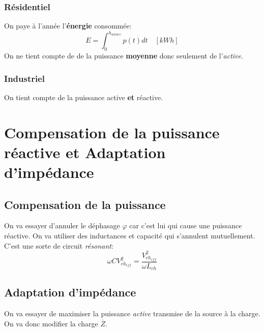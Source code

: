 \documentclass{report}
\begin{document}
\subsubsection{Résidentiel}
On paye à l'année l'\textbf{énergie} consommée:
\begin{equation}
E = \int_0^{h_{annee}} p(t) dt \quad [kWh]
\end{equation}
On ne tient compte de de la puissance \textbf{moyenne} donc seulement de l'\textit{active}.

\subsubsection{Industriel}
On tient compte de la puissance active \textbf{et} réactive.

\section{Compensation de la puissance réactive et Adaptation d'impédance}
\subsection{Compensation de la puissance}
On va essayer d'annuler le déphasage $\varphi$ car c'est lui qui cause une puissance réactive. On va utiliser des inductances et capacité qui s'annulent mutuellement. C'est une sorte de circuit \textit{résonant}:
\begin{equation}
\omega C V_{ch_{eff}}^2 = \frac{V_{ch_{eff}}^2}{\omega L_{ch}}
\end{equation}

\subsection{Adaptation d'impédance}
On va essayer de maximiser la puissance \textit{active} transmise de la source à la charge. On va donc modifier la charge $\overline{Z}$.
\end{document}
